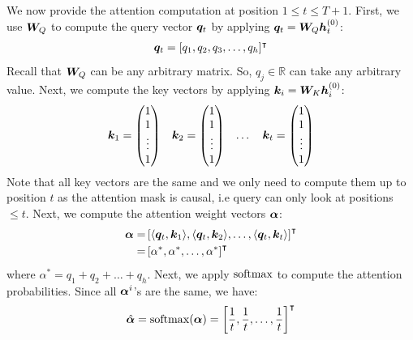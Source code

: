 \documentclass{article}
\begin{document}
We now provide the attention computation at position $1 \le t \le T+1$. First, we use ${\bm{W}}_Q$ to compute the query vector ${\bm{q}}_t$ by applying ${\bm{q}}_t = {\bm{W}}_Q{\bm{h}}_t^{(0)}$:
\begin{align}
  \label{eq:abs_query}
  {\bm{q}}_t = [q_1, q_2, q_3, \dots, q_h]^\intercal
\end{align}
Recall that ${\bm{W}}_Q$ can be any arbitrary matrix. So, $q_j \in \mathbb{R}$ can take any arbitrary value. Next, we compute the key vectors by applying ${\bm{k}}_i = {\bm{W}}_K{\bm{h}}_i^{(0)}$:
\begin{align}
  \label{eq:abs_key}
  \begin{array}{cccc}
    {\bm{k}}_1 = \begin{pmatrix} 1 \\ 1 \\ \vdots \\ 1 \end{pmatrix} &
    {\bm{k}}_2 = \begin{pmatrix} 1 \\ 1 \\ \vdots \\ 1 \end{pmatrix} &
    \dots                                                       &
    {\bm{k}}_{t} = \begin{pmatrix} 1 \\ 1 \\ \vdots \\ 1 \end{pmatrix}
  \end{array}
\end{align}
Note that all key vectors are the same and we only need to compute them up to position $t$ as the attention mask is causal, i.e query can only look at positions $\le t$. Next, we compute the attention weight vectors ${\bm{\alpha}}$:
\begin{align}
  \label{eq:abs_attention_weight}
  {\bm{\alpha}} = & \left[\langle {\bm{q}}_t, {\bm{k}}_1 \rangle, \langle {\bm{q}}_t, {\bm{k}}_2 \rangle, \ldots, \langle {\bm{q}}_t, {\bm{k}}_t \rangle \right]^\intercal \\
  =         & \left[\alpha^*, \alpha^*, \ldots, \alpha^* \right]^\intercal
\end{align}
where $\alpha^* = q_1 + q_2 + \ldots + q_h$. Next, we apply $\mathrm{softmax}$ to compute the attention probabilities. Since all ${\bm{\alpha}}^i$'s are the same, we have:
\begin{align}
  \label{eq:abs_attention_prob}
  \hat{{\bm{\alpha}}} = \mathrm{softmax}({\bm{\alpha}}) = \left[\frac{1}{t}, \frac{1}{t}, \ldots, \frac{1}{t} \right]^\intercal
\end{align}
\end{document}
